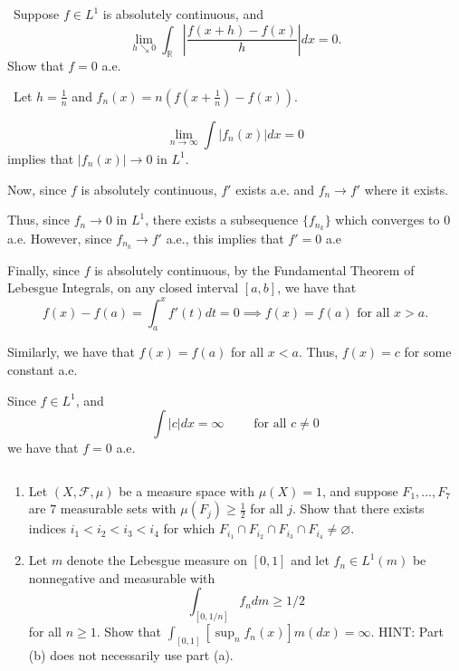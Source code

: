 \documentclass[12pt]{Qual}
\begin{document}
\newpage

\begin{problem} $\,$
Suppose $f\in L^1$ is absolutely continuous, and $$\lim_{h\searrow0}\int_\mathbb{R}\left|\frac{f(x+h)-f(x)}{h}\right|dx=0.$$ Show that $f=0$ a.e.
\end{problem}


\begin{solution}$\,$
Let $h=\frac{1}{n}$ and $f_n(x)=n(f(x+\frac{1}{n})-f(x))$.

$$\lim_{n\to\infty}\int|f_n(x)|dx=0$$ implies that $|f_n(x)|\to0$ in $L^1$.

Now, since $f$ is absolutely continuous, $f'$ exists a.e. and $f_n\to f'$ where it exists.

Thus, since $f_n\to0$ in $L^1$, there exists a subsequence $\{f_{n_k}\}$ which converges to $0$ a.e. However, since $f_{n_k}\to f'$ a.e., this implies that $f'=0$ a.e

Finally, since $f$ is absolutely continuous, by the Fundamental Theorem of Lebesgue Integrals, on any closed interval $[a,b]$, we have that $$f(x)-f(a)=\int_a^xf'(t)dt=0\implies f(x)=f(a)\text{ for all } x>a.$$

Similarly, we have that $f(x)=f(a)$ for all $x<a$. Thus, $f(x)=c$ for some constant a.e.

Since $f\in L^1$, and $$\int|c|dx=\infty\qquad\text{ for all }c\not=0$$ we have that $f=0$ a.e.
\end{solution}
\newpage

\begin{problem} $\,$
\begin{enumerate}[label=(\alph*)]
    \item Let $(X,\mathscr{F},\mu)$ be a measure space with $\mu(X)=1$, and suppose $F_1,...,F_7$ are $7$ measurable sets with $\mu(F_j)\ge\frac{1}{2}$ for all $j$. Show that there exists indices $i_1<i_2<i_3<i_4$ for which $F_{i_1}\cap F_{i_2}\cap F_{i_3}\cap F_{i_4}\not=\varnothing.$
    \item Let $m$ denote the Lebesgue measure on $[0,1]$ and let $f_n\in L^1(m)$ be nonnegative and measurable with $$\int_{[0,1/n]}f_ndm\ge1/2$$ for all $n\ge1.$ Show that $\int_{[0,1]}[\sup_nf_n(x)]m(dx)=\infty.$ HINT: Part (b) does not necessarily use part (a).
\end{enumerate}
\end{problem}
\end{document}
